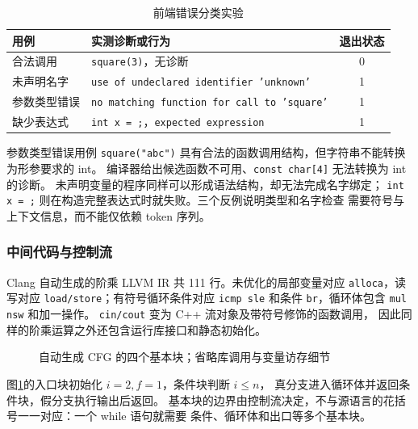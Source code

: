 \begin{table}[htbp]
\centering\small
\caption{前端错误分类实验}
\begin{tabularx}{\textwidth}{lYc}
\toprule 用例 & 实测诊断或行为 & 退出状态\\\midrule
合法调用 & \texttt{square(3)}，无诊断 & 0\\
未声明名字 & \texttt{use of undeclared identifier 'unknown'} & 1\\
参数类型错误 & \texttt{no matching function for call to 'square'} & 1\\
缺少表达式 & \texttt{int x = ;}，\texttt{expected expression} & 1\\
\bottomrule
\end{tabularx}
\end{table}

参数类型错误用例 \texttt{square("abc")} 具有合法的函数调用结构，但字符串不能转换为形参要求的 int。
编译器给出候选函数不可用、\texttt{const char[4]} 无法转换为 int 的诊断。
未声明变量的程序同样可以形成语法结构，却无法完成名字绑定；
\texttt{int x = ;} 则在构造完整表达式时就失败。三个反例说明类型和名字检查
需要符号与上下文信息，而不能仅依赖 token 序列。

\subsubsection{中间代码与控制流}

Clang 自动生成的阶乘 LLVM IR 共 111 行。未优化的局部变量对应
\texttt{alloca}，读写对应 \texttt{load/store}；有符号循环条件对应
\texttt{icmp sle} 和条件 \texttt{br}，循环体包含 \texttt{mul nsw} 和加一操作。
\texttt{cin/cout} 变为 C++ 流对象及带符号修饰的函数调用，
因此同样的阶乘运算之外还包含运行库接口和静态初始化。
\begin{figure}[H]
\centering
{}
\caption{自动生成 CFG 的四个基本块；省略库调用与变量访存细节}\label{fig:zlf-cfg}
\end{figure}
图\ref{fig:zlf-cfg}的入口块初始化 $i=2,f=1$，条件块判断 $i\leq n$，
真分支进入循环体并返回条件块，假分支执行输出后返回。
基本块的边界由控制流决定，不与源语言的花括号一一对应：一个 while 语句就需要
条件、循环体和出口等多个基本块。

